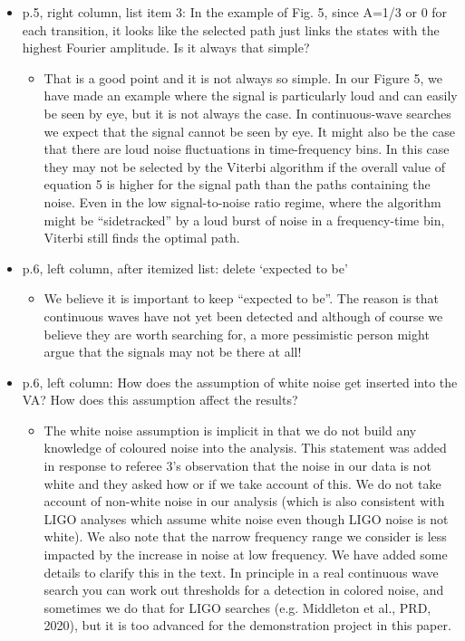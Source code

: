 \documentclass[a4paper, 10pt]{letter}
\begin{document}
\begin{itemize}
\item p.5, right column, list item 3: In the example of Fig. 5, since A=1/3 or 0 for each transition, it looks like the selected path just links the states with the highest Fourier amplitude. Is it always that simple?
\begin{itemize}
\item That is a good point and it is not always so simple. In our Figure 5, we have made an example where the signal is particularly loud and can easily be seen by eye, but it is not always the case. In continuous-wave searches we expect that the signal cannot be seen by eye. It might also be the case that there are loud noise fluctuations in time-frequency bins. In this case they may not be selected by the Viterbi algorithm if the overall value of equation 5 is higher for the signal path than the paths containing the noise. Even in the low signal-to-noise ratio regime, where the algorithm might be ``sidetracked'' by a loud burst of noise in a frequency-time bin, Viterbi still finds the optimal path. 
\end{itemize}

\item p.6, left column, after itemized list: delete `expected to be' 
\begin{itemize}
\item We believe it is important to keep ``expected to be''. The reason is that continuous waves have not yet been detected and although of course we believe they are worth searching for, a more pessimistic person might argue that the signals may not be there at all! 
\end{itemize}

\item p.6, left column: How does the assumption of white noise get inserted into the VA? How does this assumption affect the results?
\begin{itemize}
\item The white noise assumption is implicit in that we do not build any knowledge of coloured noise into the analysis. This statement was added in response to referee 3's observation that the noise in our data is not white and they asked how or if we take account of this. We do not take account of non-white noise in our analysis (which is also consistent with LIGO analyses which assume white noise even though LIGO noise is not white). We also note that the narrow frequency range we consider is less impacted by the increase in noise at low frequency. We have added some details to clarify this in the text. In principle in a real continuous wave search you can work out thresholds for a detection in colored noise, and sometimes we do that for LIGO searches (e.g. Middleton et al., PRD, 2020), but it is too advanced for the demonstration project in this paper. 
\end{itemize}


\end{itemize}
\end{document}
